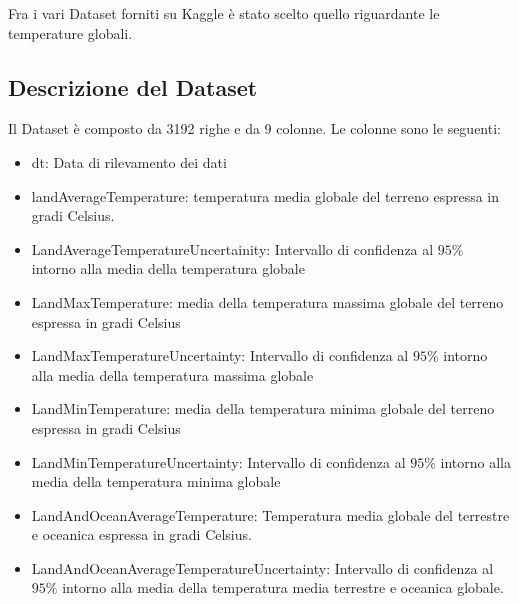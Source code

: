 \documentclass[10pt, a4paper, twocolumn]{article} %
\begin{document}
Fra i vari Dataset forniti su Kaggle è stato scelto quello riguardante le temperature globali.

\subsection{Descrizione del Dataset}
Il Dataset è composto da 3192 righe e da 9 colonne.
Le colonne sono le seguenti:
\begin{itemize}
	\item dt: Data di rilevamento dei dati
	\item landAverageTemperature: temperatura media globale del terreno espressa in gradi Celsius.
	\item LandAverageTemperatureUncertainity: Intervallo di confidenza al $95 \%$ intorno alla media della temperatura globale
	\item LandMaxTemperature: media della temperatura massima globale del terreno espressa in gradi Celsius
	\item LandMaxTemperatureUncertainty:  Intervallo di confidenza al $95 \%$ intorno alla media della temperatura massima globale
	\item LandMinTemperature: media della temperatura minima globale del terreno espressa in gradi Celsius
	\item LandMinTemperatureUncertainty: Intervallo di confidenza al $95 \%$ intorno alla media della temperatura minima globale
	\item LandAndOceanAverageTemperature: Temperatura media globale del terrestre e oceanica espressa in gradi Celsius.
	\item LandAndOceanAverageTemperatureUncertainty: Intervallo di confidenza al $95 \%$ intorno alla media della temperatura media terrestre e oceanica globale.
\end{itemize}
\end{document}
